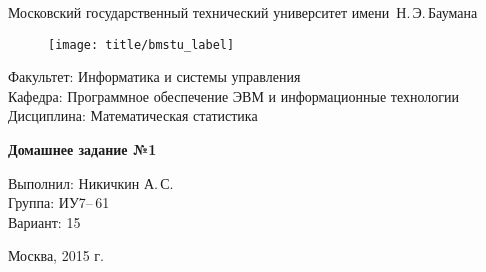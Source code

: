 
\thispagestyle{empty}

\begin{center}
    \Large
    Московский государственный технический университет имени~Н.\,Э.\,Баумана
\end{center}

\begin{figure}[h!]
    \begin{center}
        \texttt{[image: title/bmstu\_label]}
    \end{center}
\end{figure}

{\large
\noindent
Факультет: Информатика и системы управления\\[2mm]
\noindent
Кафедра: Программное обеспечение ЭВМ и информационные технологии\\[2mm]
\noindent
Дисциплина: Математическая статистика
\vspace{1.5cm}}

\begin{center}
    \Large
    \textbf{Домашнее задание №1} \\
\end{center}
\vfill

\hfill\begin{minipage}{0.35\textwidth}
    Выполнил: Никичкин А.\,С.\\
    Группа: ИУ7--\,61\\
    Вариант: 15
\end{minipage}
\vfill

\begin{center}
    Москва, 2015 г.
\end{center}